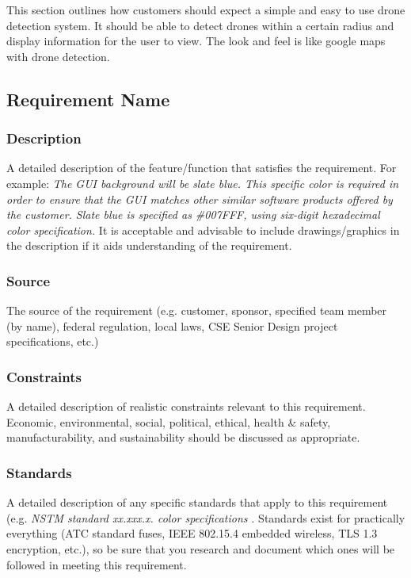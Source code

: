 This section outlines how customers should expect a simple and easy to use drone detection system.  It should be able to detect drones within a certain radius and display information for the user to view.  The look and feel is like google maps with drone detection.

\subsection{Requirement Name}
\subsubsection{Description}
A detailed description of the feature/function that satisfies the requirement. For example: \textit{The GUI background will be slate blue. This specific color is required in order to ensure that the GUI matches other similar software products offered by the customer. Slate blue is specified as \#007FFF, using six-digit hexadecimal color specification.} It is acceptable and advisable to include drawings/graphics in the description if it aids understanding of the requirement.
\subsubsection{Source}
The source of the requirement (e.g. customer, sponsor, specified team member (by name), federal regulation, local laws, CSE Senior Design project specifications, etc.)
\subsubsection{Constraints}
A detailed description of realistic constraints relevant to this requirement. Economic, environmental, social, political, ethical, health \& safety, manufacturability, and sustainability should be discussed as appropriate.
\subsubsection{Standards}
A detailed description of any specific standards that apply to this requirement (e.g. \textit{NSTM standard xx.xxx.x. color specifications \cite{Rubin2012}}. Standards exist for practically everything (ATC standard fuses, IEEE 802.15.4 embedded wireless, TLS 1.3 encryption, etc.), so be sure that you research and document which ones will be followed in meeting this requirement.
